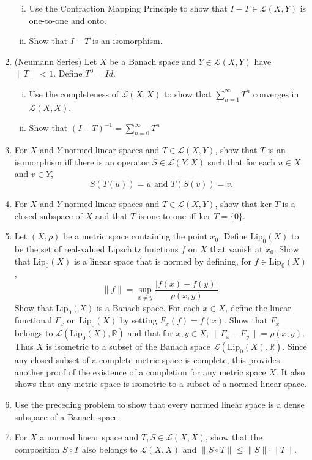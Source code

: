 \begin{enumerate}
\begin{enumerate}[(i)]
        \item Use the Contraction Mapping Principle to show that $I-T\in\mathcal{L}(X,Y)$ is one-to-one and onto.
        \item Show that $I-T$ is an isomorphism.
    \end{enumerate}
    \item (Neumann Series) Let $X$ be a Banach space and $Y\in\mathcal{L}(X,Y)$ have $\|T\|<1$.
    Define $T^0=Id$.
    \begin{enumerate}[(i)]
        \item Use the completeness of $\mathcal{L}(X,X)$ to show that $\sum_{n=1}^\infty T^n$ converges in $\mathcal{L}(X,X)$.
        \item Show that $(I-T)^{-1}=\sum_{n=0}^\infty T^n$
    \end{enumerate}
    \item For $X$ and $Y$ normed linear spaces and $T\in\mathcal{L}(X,Y)$, show that $T$ is an isomorphism iff there is an operator $S\in\mathcal{L}(Y,X)$ such that for each $u\in X$ and $v\in Y$,
    \[
        S(T(u))=u\text{ and }T(S(v))=v.
    \]
    \item For $X$ and $Y$ normed linear spaces and $T\in\mathcal{L}(X,Y)$, show that $\text{ker }T$ is a closed subspace of $X$ and that $T$ is one-to-one iff $\text{ker }T=\{0\}$.
    \item Let $(X,\rho)$ be a metric space containing the point $x_0$.
    Define $\text{Lip}_0(X)$ to be the set of real-valued Lipschitz functions $f$ on $X$ that vanish at $x_0$.
    Show that $\text{Lip}_0(X)$ is a linear space that is normed by defining, for $f\in\text{Lip}_0(X)$,
    \[
        \|f\|=\sup_{x\neq y}\frac{|f(x)-f(y)|}{\rho(x,y)}.
    \]
    Show that $\text{Lip}_0(X)$ is a Banach space.
    For each $x\in X$, define the linear functional $F_x$ on $\text{Lip}_0(X)$ by setting $F_x(f)=f(x)$.
    Show that $F_x$ belongs to $\mathcal{L}(\text{Lip}_0(X),\mathbb{R})$ and that for $x,y\in X$, $\|F_x-F_y\|=\rho(x,y)$.
    Thus $X$ is isometric to a subset of the Banach space $\mathcal{L}(\text{Lip}_0(X),\mathbb{R})$.
    Since any closed subset of a complete metric space is complete, this provides another proof of the existence of a completion for any metric space $X$.
    It also shows that any metric space is isometric to a subset of a normed linear space.
    \item Use the preceding problem to show that every normed linear space is a dense subspace of a Banach space.
    \item For $X$ a normed linear space and $T,S\in\mathcal{L}(X,X)$, show that the composition $S\circ T$ also belongs to $\mathcal{L}(X,X)$ and $\|S\circ T\|\le\|S\|\cdot\|T\|$.

\end{enumerate}
